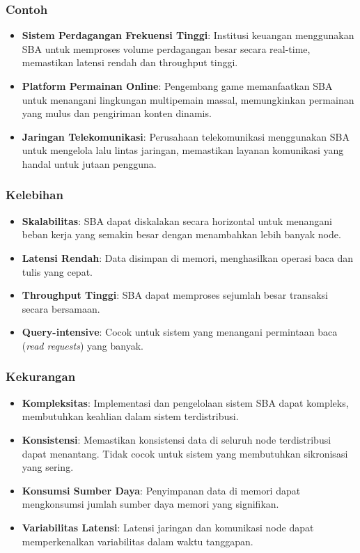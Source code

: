 \documentclass[aspectratio=169, table]{beamer}
\begin{document}
    \begin{frame}
        \frametitle{Contoh}
        \begin{itemize}
            \item \textbf{Sistem Perdagangan Frekuensi Tinggi}: Institusi keuangan menggunakan SBA untuk memproses volume perdagangan besar secara real-time, memastikan latensi rendah dan throughput tinggi.
            \item \textbf{Platform Permainan Online}: Pengembang game memanfaatkan SBA untuk menangani lingkungan multipemain massal, memungkinkan permainan yang mulus dan pengiriman konten dinamis.
            \item \textbf{Jaringan Telekomunikasi}: Perusahaan telekomunikasi menggunakan SBA untuk mengelola lalu lintas jaringan, memastikan layanan komunikasi yang handal untuk jutaan pengguna.
        \end{itemize}
    \end{frame}

    \begin{frame}
        \frametitle{Kelebihan}
        \begin{itemize}
            \item \textbf{Skalabilitas}: SBA dapat diskalakan secara horizontal untuk menangani beban kerja yang semakin besar dengan menambahkan lebih banyak node.
            \item \textbf{Latensi Rendah}: Data disimpan di memori, menghasilkan operasi baca dan tulis yang cepat.
            \item \textbf{Throughput Tinggi}: SBA dapat memproses sejumlah besar transaksi secara bersamaan.
            \item \textbf{Query-intensive}: Cocok untuk sistem yang menangani permintaan baca (\textit{read requests}) yang banyak.
        \end{itemize}
    \end{frame}

    \begin{frame}
        \frametitle{Kekurangan}
        \begin{itemize}
            \item \textbf{Kompleksitas}: Implementasi dan pengelolaan sistem SBA dapat kompleks, membutuhkan keahlian dalam sistem terdistribusi.
            \item \textbf{Konsistensi}: Memastikan konsistensi data di seluruh node terdistribusi dapat menantang. Tidak cocok untuk sistem yang membutuhkan sikronisasi yang sering.
            \item \textbf{Konsumsi Sumber Daya}: Penyimpanan data di memori dapat mengkonsumsi jumlah sumber daya memori yang signifikan.
            \item \textbf{Variabilitas Latensi}: Latensi jaringan dan komunikasi node dapat memperkenalkan variabilitas dalam waktu tanggapan.
        \end{itemize}
    \end{frame}
\end{document}
